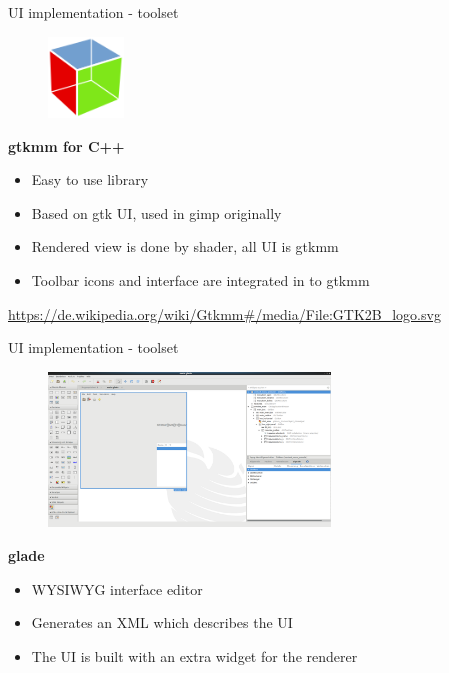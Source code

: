 \documentclass[shortpres,usenames,dvipsnames]{beamer}
\begin{document}
\begin{frame}[fragile]{UI implementation - toolset}
	\begin{figure}
		\includegraphics[clip, width=20mm]{img/GTK_logo.png}
	\end{figure}
	\textbf{gtkmm for C++}
	\begin{itemize}
		\item Easy to use library 
		\item Based on gtk UI, used in gimp originally
		\item Rendered view is done by shader, all UI is gtkmm
		\item Toolbar icons and interface are integrated in to gtkmm 
	\end{itemize}
	\vfill
	\flushleft
	{\fontsize{5}{5} \selectfont \url{https://de.wikipedia.org/wiki/Gtkmm#/media/File:GTK2B_logo.svg}}
\end{frame}
	
\begin{frame}[fragile]{UI implementation - toolset}
	\begin{figure}
		\includegraphics[clip, width=75mm]{img/glade.png}
	\end{figure}
	\textbf{glade}\\
	\begin{itemize}
		\item WYSIWYG interface editor 
		\item Generates an XML which describes the UI
		\item The UI is built with an extra widget for the renderer
	\end{itemize}
\end{frame}
\end{document}
